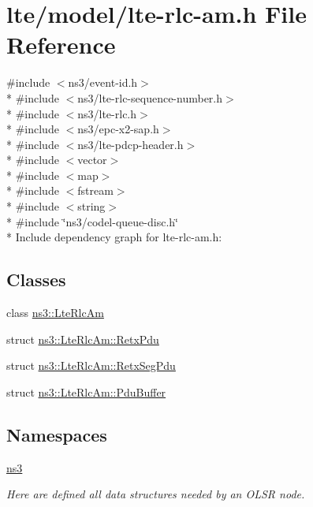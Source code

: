 \hypertarget{lte-rlc-am_8h}{}\section{lte/model/lte-\/rlc-\/am.h File Reference}
\label{lte-rlc-am_8h}
{\ttfamily \#include $<$ns3/event-\/id.\+h$>$}\\*
{\ttfamily \#include $<$ns3/lte-\/rlc-\/sequence-\/number.\+h$>$}\\*
{\ttfamily \#include $<$ns3/lte-\/rlc.\+h$>$}\\*
{\ttfamily \#include $<$ns3/epc-\/x2-\/sap.\+h$>$}\\*
{\ttfamily \#include $<$ns3/lte-\/pdcp-\/header.\+h$>$}\\*
{\ttfamily \#include $<$vector$>$}\\*
{\ttfamily \#include $<$map$>$}\\*
{\ttfamily \#include $<$fstream$>$}\\*
{\ttfamily \#include $<$string$>$}\\*
{\ttfamily \#include \char`\"{}ns3/codel-\/queue-\/disc.\+h\char`\"{}}\\*
Include dependency graph for lte-\/rlc-\/am.h\+:
\subsection*{Classes}
\begin{DoxyCompactItemize}
\item 
class \hyperlink{classns3_1_1LteRlcAm}{ns3\+::\+Lte\+Rlc\+Am}
\item 
struct \hyperlink{structns3_1_1LteRlcAm_1_1RetxPdu}{ns3\+::\+Lte\+Rlc\+Am\+::\+Retx\+Pdu}
\item 
struct \hyperlink{structns3_1_1LteRlcAm_1_1RetxSegPdu}{ns3\+::\+Lte\+Rlc\+Am\+::\+Retx\+Seg\+Pdu}
\item 
struct \hyperlink{structns3_1_1LteRlcAm_1_1PduBuffer}{ns3\+::\+Lte\+Rlc\+Am\+::\+Pdu\+Buffer}
\end{DoxyCompactItemize}
\subsection*{Namespaces}
\begin{DoxyCompactItemize}
\item 
 \hyperlink{namespacens3}{ns3}
\begin{DoxyCompactList}\small\item\em Here are defined all data structures needed by an O\+L\+SR node. \end{DoxyCompactList}\end{DoxyCompactItemize}
